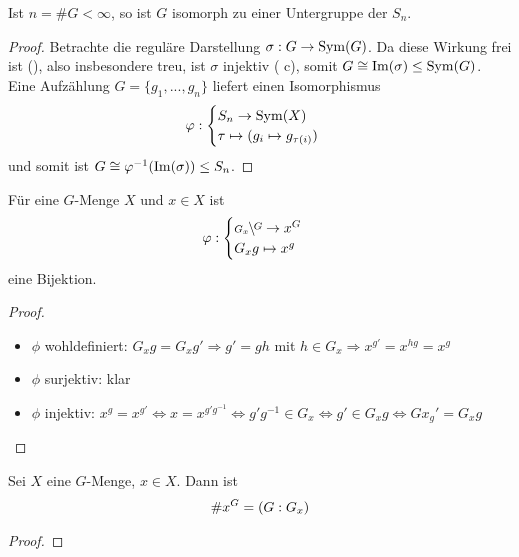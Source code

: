 \begin{proposition}
	Ist $n=\#G<\infty$, so ist $G$ isomorph zu einer Untergruppe der $S_n$.
\end{proposition}
\begin{proof}
	Betrachte die reguläre Darstellung $\sigma:G\to\operatorname{Sym}(G)$. Da diese Wirkung frei ist (), also insbesondere treu, ist $\sigma$ injektiv ( c), somit $G\cong \operatorname{Im}(\sigma)\le\operatorname{Sym}(G)$. Eine Aufzählung $G=\{g_1,...,g_n\}$ liefert einen Isomorphismus
	\begin{align}
		\varphi:\begin{cases}
			S_n\to \operatorname{Sym}(X) \\ \tau\mapsto (g_i\mapsto g_{\tau(i)})
		\end{cases}\notag
	\end{align}
	und somit ist $G\cong \varphi^{-1}(\operatorname{Im}(\sigma))\le S_n$.
\end{proof}

\begin{lemma}
	Für eine $G$-Menge $X$ und $x\in X$ ist
	\begin{align}
		\phi:\begin{cases}
			\rnkset{G}{G_x}\to x^G \\ G_xg\mapsto x^g
		\end{cases}\notag
	\end{align}
	eine Bijektion.
\end{lemma}
\begin{proof}
	\begin{itemize}
		\item $\phi$ wohldefiniert: $G_xg=G_xg'\Rightarrow g'=gh$ mit $h\in G_x\Rightarrow x^{g'}=x^{hg}=x^g$
		\item $\phi$ surjektiv: klar
		\item $\phi$ injektiv: $x^g=x^{g'}\Leftrightarrow x=x^{g'g^{-1}}\Leftrightarrow g'g^{-1}\in G_x\Leftrightarrow g'\in G_xg\Leftrightarrow Gx_g'=G_xg$
	\end{itemize}
\end{proof}

\begin{proposition}
	Sei $X$ eine $G$-Menge, $x\in X$. Dann ist
	\begin{align}
		\# x^G = (G:G_x) \notag
	\end{align}
\end{proposition}
\begin{proof}
\end{proof}

